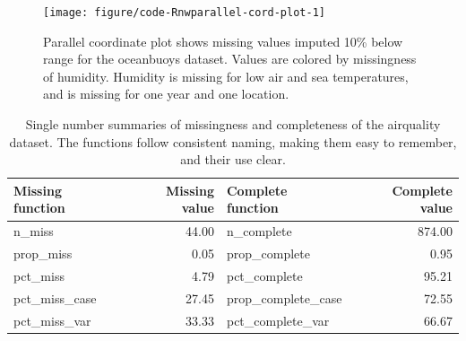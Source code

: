 \documentclass{article}\usepackage[]{graphicx}\usepackage[]{xcolor}
\newenvironment{knitrout}{}{} %
\begin{document}
\begin{knitrout}
\color{fgcolor}\begin{figure}

{\centering \texttt{[image: figure/code-Rnwparallel-cord-plot-1]} 

}

\caption[Parallel coordinate plot shows missing values imputed 10\% below range for the oceanbuoys dataset]{Parallel coordinate plot shows missing values imputed 10\% below range for the oceanbuoys dataset. Values are colored by missingness of humidity. Humidity is missing for low air and sea temperatures, and is missing for one year and one location.}\label{fig:parallel-cord-plot}
\end{figure}

\end{knitrout}
\begin{knitrout}
\color{fgcolor}\begin{table}

\caption{\label{tab:n-prop-pct-miss-complete}Single number summaries of missingness and completeness of the airquality dataset. The functions follow consistent naming, making them easy to remember, and their use clear.}
\centering
\begin{tabular}[t]{l|r|l|r}
\hline
Missing function & Missing value & Complete function & Complete value\\
\hline
n\_miss & 44.00 & n\_complete & 874.00\\
\hline
prop\_miss & 0.05 & prop\_complete & 0.95\\
\hline
pct\_miss & 4.79 & pct\_complete & 95.21\\
\hline
pct\_miss\_case & 27.45 & prop\_complete\_case & 72.55\\
\hline
pct\_miss\_var & 33.33 & pct\_complete\_var & 66.67\\
\hline
\end{tabular}
\end{table}

\end{knitrout}
\end{document}

